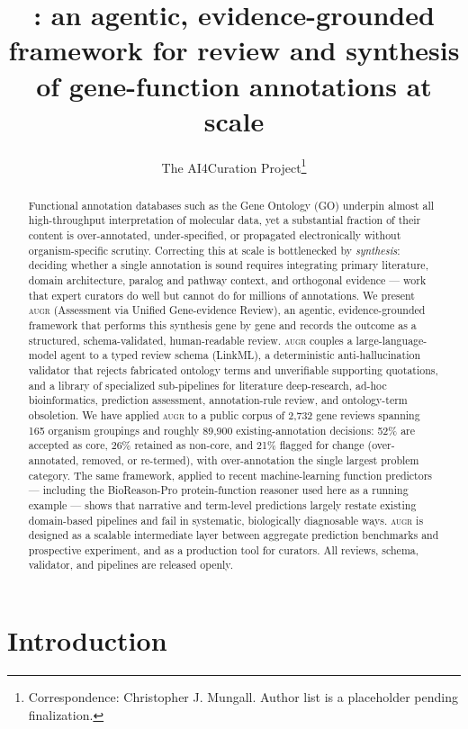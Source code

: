 \documentclass[11pt]{article}
\title{\augr{}: an agentic, evidence-grounded framework for review and
synthesis of gene-function annotations at scale}
\author{The AI4Curation Project\thanks{Correspondence: Christopher J. Mungall.
Author list is a placeholder pending finalization.}}
\date{}
\newcommand{\augr}{\textsc{augr}}
\begin{document}
\maketitle

\begin{abstract}
\noindent
Functional annotation databases such as the Gene Ontology (GO) underpin almost
all high-throughput interpretation of molecular data, yet a substantial fraction
of their content is over-annotated, under-specified, or propagated electronically
without organism-specific scrutiny. Correcting this at scale is bottlenecked by
\emph{synthesis}: deciding whether a single annotation is sound requires
integrating primary literature, domain architecture, paralog and pathway context,
and orthogonal evidence --- work that expert curators do well but cannot do for
millions of annotations. We present \augr{} (Assessment via Unified Gene-evidence
Review), an agentic, evidence-grounded framework that performs this synthesis gene
by gene and records the outcome as a structured, schema-validated, human-readable
review. \augr{} couples a large-language-model agent to a typed review schema
(LinkML), a deterministic anti-hallucination validator that rejects fabricated
ontology terms and unverifiable supporting quotations, and a library of
specialized sub-pipelines for literature deep-research, ad-hoc bioinformatics,
prediction assessment, annotation-rule review, and ontology-term obsoletion. We
have applied \augr{} to a public corpus of 2{,}732 gene reviews spanning 165
organism groupings and roughly 89{,}900 existing-annotation decisions: 52\% are
accepted as core, 26\% retained as non-core, and 21\% flagged for change
(over-annotated, removed, or re-termed), with over-annotation the single largest
problem category. The same framework, applied to recent machine-learning function
predictors --- including the BioReason-Pro protein-function reasoner used here as
a running example --- shows that narrative and term-level predictions largely
restate existing domain-based pipelines and fail in systematic, biologically
diagnosable ways. \augr{} is designed as a scalable intermediate layer between
aggregate prediction benchmarks and prospective experiment, and as a production
tool for curators. All reviews, schema, validator, and pipelines are released
openly.
\end{abstract}

\section{Introduction}
\end{document}

